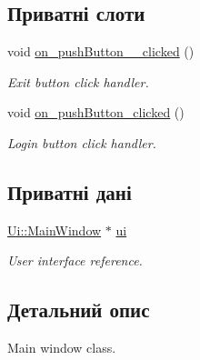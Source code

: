 \subsection*{Приватні слоти}
\begin{DoxyCompactItemize}
\item 
\hypertarget{classMainWindow_ae0e46dc3da4ee07bf66e73e20300220c}{void \hyperlink{classMainWindow_ae0e46dc3da4ee07bf66e73e20300220c}{on\-\_\-push\-Button\-\_\-\_\-clicked} ()}\label{classMainWindow_ae0e46dc3da4ee07bf66e73e20300220c}

\begin{DoxyCompactList}\small\item\em Exit button click handler. \end{DoxyCompactList}\item 
\hypertarget{classMainWindow_a4de79c63c7fa0b8d7c468ac71f20be81}{void \hyperlink{classMainWindow_a4de79c63c7fa0b8d7c468ac71f20be81}{on\-\_\-push\-Button\-\_\-clicked} ()}\label{classMainWindow_a4de79c63c7fa0b8d7c468ac71f20be81}

\begin{DoxyCompactList}\small\item\em Login button click handler. \end{DoxyCompactList}\end{DoxyCompactItemize}
\subsection*{Приватні дані}
\begin{DoxyCompactItemize}
\item 
\hypertarget{classMainWindow_a35466a70ed47252a0191168126a352a5}{\hyperlink{classUi_1_1MainWindow}{Ui\-::\-Main\-Window} $\ast$ \hyperlink{classMainWindow_a35466a70ed47252a0191168126a352a5}{ui}}\label{classMainWindow_a35466a70ed47252a0191168126a352a5}

\begin{DoxyCompactList}\small\item\em User interface reference. \end{DoxyCompactList}\end{DoxyCompactItemize}


\subsection{Детальний опис}
Main window class. 

